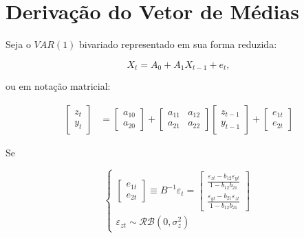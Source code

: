 
\chapter{Derivação do Vetor de Médias}


Seja o \(VAR(1)\) bivariado representado em sua forma reduzida:

\begin{equation}
X_t = A_0 + A_1X_{t-1} + e_t, 
\end{equation}

ou em notação matricial: 

\begin{equation}
\label{eq:var_reduz_matrix}
\begin{aligned} \begin{bmatrix}
z_t \\ y_t \end{bmatrix} &=\begin{bmatrix}
a_{10} \\ a_{20}\end{bmatrix} +
\begin{bmatrix}a_{11} & a_{12} \\a_{21} & a_{22}
\end{bmatrix}\begin{bmatrix} z_{t-1} \\ y_{t-1}
\end{bmatrix}  +\begin{bmatrix} e_{1t} \\ e_{2t}
\end{bmatrix}\end{aligned}
\end{equation}

Se

\begin{equation}
\left\{ 
\begin{array}{l}

\begin{bmatrix}e_{1t} \\e_{2t}
\end{bmatrix}\equiv B^{-1}\varepsilon_t =\begin{bmatrix}
\frac{\varepsilon_{zt} - b_{12} \varepsilon_{yt}}{1 - b_{12}b_{21}} \\[5pt]\frac{\varepsilon_{yt} - b_{21} \varepsilon_{zt}}{1 - b_{12}b_{21}}\end{bmatrix}
\\
\varepsilon_{zt} \sim \mathcal{RB}(0, \sigma^2_z) 

\end{array} 
\right.
\end{equation}

